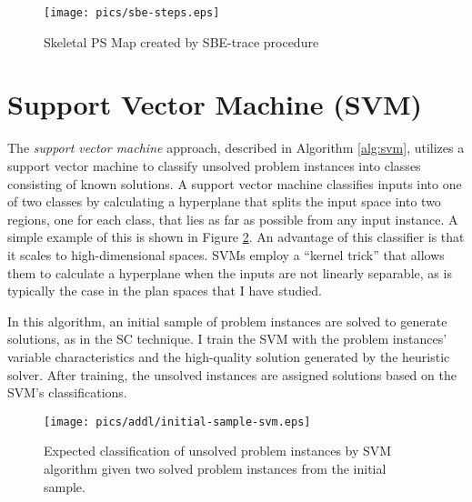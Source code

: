 \begin{figure}
\begin{center}
    \texttt{[image: pics/sbe-steps.eps]}
    \caption{Skeletal PS Map created by SBE-trace procedure}
    \label{fig:sbe-steps}
\end{center}
\end{figure}





\section{Support Vector Machine (SVM)}
The \textit{support vector machine} approach, described in Algorithm \ref{alg:svm}, utilizes a support vector machine \citep{vapnik95svm} to classify unsolved problem instances into classes consisting of known solutions.  A support vector machine classifies inputs into one of two classes by calculating a hyperplane that splits the input space into two regions, one for each class, that  lies as far as possible from any input instance.  A simple example of this is shown in Figure \ref{fig:initial-sample-svm-addl}.  An advantage of this classifier is that it scales to high-dimensional spaces.  SVMs employ a ``kernel trick'' that allows them to calculate a hyperplane when the inputs are not linearly separable, as is typically the case  in the plan spaces that I have studied.

In this algorithm, an initial sample of problem instances are solved to generate solutions, as in the SC technique.  I train the SVM with the problem instances' variable characteristics and the high-quality solution generated by the heuristic solver.    After training, the unsolved instances are assigned solutions based on  the SVM's classifications.

\begin{figure}
\begin{center}
    \texttt{[image: pics/addl/initial-sample-svm.eps]}
    \caption{Expected classification of unsolved problem instances by SVM algorithm given two solved problem instances from the initial sample.}
    \label{fig:initial-sample-svm-addl}
\end{center}
\end{figure}


